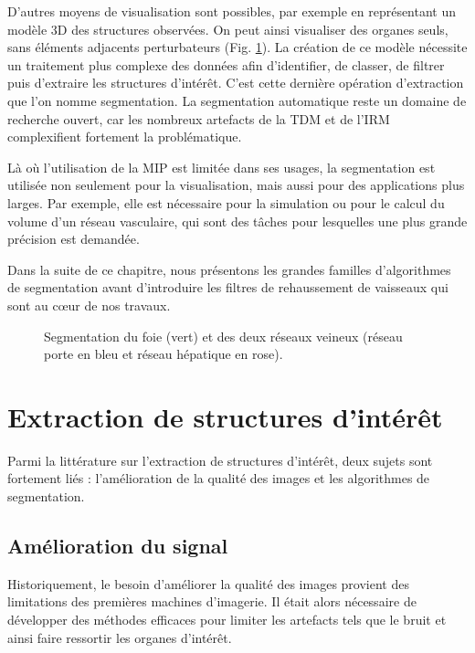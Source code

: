      D'autres moyens de visualisation sont possibles, par exemple en représentant un modèle 3D des structures observées. On peut ainsi visualiser des organes seuls, sans éléments adjacents perturbateurs (Fig. \ref{fig:segmentation_3D}). La création de ce modèle nécessite un traitement plus complexe des données afin d'identifier, de classer, de filtrer puis d'extraire les structures d'intérêt. C'est cette dernière opération d'extraction que l'on nomme segmentation. La segmentation automatique reste un domaine de recherche ouvert, car les nombreux artefacts de la TDM et de l'IRM complexifient fortement la problématique.
      
      Là où l'utilisation de la MIP est limitée dans ses usages, la segmentation est utilisée non seulement pour la visualisation, mais aussi pour des applications plus larges. Par exemple, elle est nécessaire pour la simulation ou pour le calcul du volume d'un réseau vasculaire, qui sont des tâches pour lesquelles une plus grande précision est demandée.
      
      Dans la suite de ce chapitre, nous présentons les grandes familles d'algorithmes de segmentation avant d'introduire les filtres de rehaussement de vaisseaux qui sont au cœur de nos travaux.

      \begin{figure}[h]
        \centering
        \caption{Segmentation du foie (vert) et des deux réseaux veineux (réseau porte en bleu et réseau hépatique en rose).}
        \label{fig:segmentation_3D}
      \end{figure}
  
  \section{Extraction de structures d'intérêt}

      Parmi la littérature sur l'extraction de structures d'intérêt, deux sujets sont fortement liés : l'amélioration de la qualité des images et les algorithmes de segmentation.

    \subsection{Amélioration du signal}
      
    Historiquement, le besoin d'améliorer la qualité des images provient des limitations des premières machines d'imagerie. Il était alors nécessaire de développer des méthodes efficaces pour limiter les artefacts tels que le bruit et ainsi faire ressortir les organes d'intérêt. 
    
